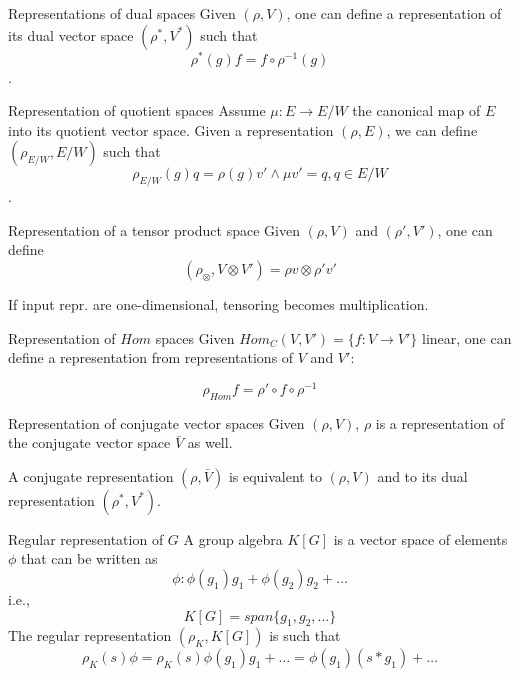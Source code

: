 \documentclass[presentation]{beamer}
\begin{document}
\begin{frame}[label={sec:org99e0cf1}]{Representations of dual spaces}
Given \((\rho,V)\), one can define a representation of its dual vector space
\((\rho^*, V^*)\) such that $$\rho^*(g) f = f \circ \rho^{-1}(g)$$.
\end{frame}

\begin{frame}[label={sec:org4714696}]{Representation of quotient spaces}
Assume \(\mu: E \rightarrow E/W\) the canonical map of \(E\) into its quotient
vector space. Given a representation \((\rho, E)\), we can define
\((\rho_{E/W}, E/W)\) such that $$\rho_{E/W}(g)q = \rho(g)v' \wedge \mu v' = q, q \in E/W$$.
\end{frame}

\begin{frame}[label={sec:org36ad552}]{Representation of a tensor product space}
Given \((\rho, V)\) and \((\rho', V')\), one can define
$$(\rho_{\otimes},V \otimes V') = \rho v \otimes \rho' v'$$

If input repr. are one-dimensional, tensoring becomes multiplication.
\end{frame}

\begin{frame}[label={sec:orgf3cb413}]{Representation of \(Hom\) spaces}
Given \(Hom_C(V, V') = \{ f: V \rightarrow V' \}\) linear, one can define
a representation from representations of \(V\) and \(V'\):

$$\rho_{Hom} f = \rho' \circ f \circ \rho^{-1}$$
\end{frame}

\begin{frame}[label={sec:orgab66ae8}]{Representation of conjugate vector spaces}
Given \((\rho,V)\), \(\rho\) is a representation of the
conjugate vector space \(\bar{V}\) as well.

A conjugate representation \((\rho, \bar{V})\) is \alert{equivalent} to \((\rho, V)\)
and to its dual representation \((\rho^*, V^*)\).
\end{frame}

\begin{frame}[label={sec:orgaa06323}]{Regular representation of \(G\)}
A group algebra \(K[G]\) is a vector space of elements \(\phi\) that can be written as
$$\phi: \phi(g_1)g_1 + \phi(g_2)g_2 + \ldots$$ i.e., $$K[G]=span\{g_1, g_2,
    \ldots \}$$ The regular representation \((\rho_{K}, K[G])\) is such that
$$\rho_{K}(s)\phi = \rho_{K}(s) \phi(g_1)g_1 + \ldots = \phi(g_1)(s*g_1) +
    \ldots$$
\end{frame}
\end{document}
